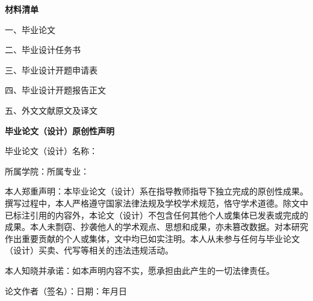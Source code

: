 \clearpage
\thispagestyle{empty}
\vspace*{2cm}
\begin{center}
{\heiti\bfseries 材\quad 料\quad 清\quad 单}
\end{center}
\vspace{1.5cm}
{\songti

\noindent 一、毕业论文

\noindent 二、毕业设计任务书

\noindent 三、毕业设计开题申请表

\noindent 四、毕业设计开题报告正文

\noindent 五、外文文献原文及译文

}

\clearpage
\thispagestyle{empty}
\vspace*{0.3cm}
\begin{center}
{\songti\bfseries \thesisUniversity 毕业论文（设计）原创性声明}
\end{center}
\vspace{0.3cm}
{\songti{}

\setlength{\parindent}{0pt}
毕业论文（设计）名称：\underline{\makebox[9.0cm][c]{\thesisTitleZhA}}

\vspace{0.2em}
\phantom{毕业论文（设计）名称：}\underline{\makebox[9.0cm][c]{\thesisTitleZhB}}

\vspace{0.4em}
所属学院：\underline{\makebox[4.3cm][c]{\thesisCollege}}\hspace{0.8em}所属专业：\underline{\makebox[4.3cm][c]{\thesisMajor}}

\vspace{0.6em}
\setlength{\parindent}{2em}
本人郑重声明：本毕业论文（设计）系在指导教师指导下独立完成的原创性成果。撰写过程中，本人严格遵守国家法律法规及学校学术规范，恪守学术道德。除文中已标注引用的内容外，本论文（设计）不包含任何其他个人或集体已发表或完成的成果。本人未剽窃、抄袭他人的学术观点、思想和成果，亦未篡改数据。对本研究作出重要贡献的个人或集体，文中均已如实注明。本人从未参与任何与毕业论文（设计）买卖、代写等相关的违法违规活动。

本人知晓并承诺：如本声明内容不实，愿承担由此产生的一切法律责任。

\vspace{0.8cm}
\setlength{\parindent}{0pt}
\hfill 论文作者（签名）：\SignBox{3.0cm}{0.85cm}{\thesisAuthorSign}\hspace{0.6em}日期：\underline{\makebox[0.9cm]{\thesisSignYear}}年\underline{\makebox[0.7cm]{\thesisSignMonth}}月\underline{\makebox[0.7cm]{\thesisSignDay}}日
}

